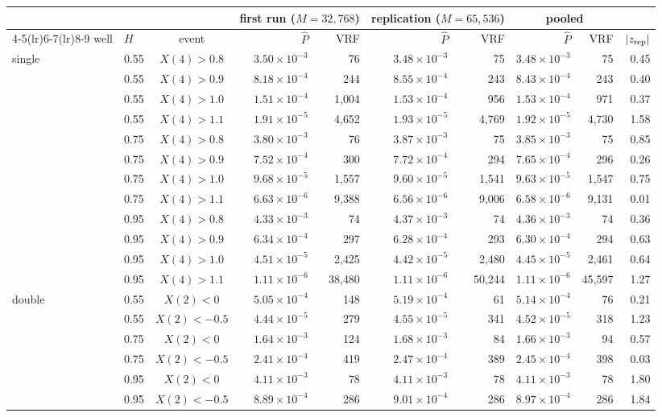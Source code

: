 \begin{tabular}{llcrrrrrrr}\toprule
 & & & \multicolumn{2}{c}{first run ($M=32{,}768$)} & \multicolumn{2}{c}{replication ($M=65{,}536$)} & \multicolumn{2}{c}{pooled} & \\\cmidrule(lr){4-5}\cmidrule(lr){6-7}\cmidrule(lr){8-9}
well & $H$ & event & $\widehat P$ & VRF & $\widehat P$ & VRF & $\widehat P$ & VRF & $|z_{\rm rep}|$\\\midrule
single & 0.55 & $X(4)>0.8$ & $3.50\times10^{-3}$ & 76 & $3.48\times10^{-3}$ & 75 & $3.48\times10^{-3}$ & 75 & 0.45\\
 & 0.55 & $X(4)>0.9$ & $8.18\times10^{-4}$ & 244 & $8.55\times10^{-4}$ & 243 & $8.43\times10^{-4}$ & 243 & 0.40\\
 & 0.55 & $X(4)>1.0$ & $1.51\times10^{-4}$ & 1{,}004 & $1.53\times10^{-4}$ & 956 & $1.53\times10^{-4}$ & 971 & 0.37\\
 & 0.55 & $X(4)>1.1$ & $1.91\times10^{-5}$ & 4{,}652 & $1.93\times10^{-5}$ & 4{,}769 & $1.92\times10^{-5}$ & 4{,}730 & 1.58\\
 & 0.75 & $X(4)>0.8$ & $3.80\times10^{-3}$ & 76 & $3.87\times10^{-3}$ & 75 & $3.85\times10^{-3}$ & 75 & 0.85\\
 & 0.75 & $X(4)>0.9$ & $7.52\times10^{-4}$ & 300 & $7.72\times10^{-4}$ & 294 & $7.65\times10^{-4}$ & 296 & 0.26\\
 & 0.75 & $X(4)>1.0$ & $9.68\times10^{-5}$ & 1{,}557 & $9.60\times10^{-5}$ & 1{,}541 & $9.63\times10^{-5}$ & 1{,}547 & 0.75\\
 & 0.75 & $X(4)>1.1$ & $6.63\times10^{-6}$ & 9{,}388 & $6.56\times10^{-6}$ & 9{,}006 & $6.58\times10^{-6}$ & 9{,}131 & 0.01\\
 & 0.95 & $X(4)>0.8$ & $4.33\times10^{-3}$ & 74 & $4.37\times10^{-3}$ & 74 & $4.36\times10^{-3}$ & 74 & 0.36\\
 & 0.95 & $X(4)>0.9$ & $6.34\times10^{-4}$ & 297 & $6.28\times10^{-4}$ & 293 & $6.30\times10^{-4}$ & 294 & 0.63\\
 & 0.95 & $X(4)>1.0$ & $4.51\times10^{-5}$ & 2{,}425 & $4.42\times10^{-5}$ & 2{,}480 & $4.45\times10^{-5}$ & 2{,}461 & 0.64\\
 & 0.95 & $X(4)>1.1$ & $1.11\times10^{-6}$ & 38{,}480 & $1.11\times10^{-6}$ & 50{,}244 & $1.11\times10^{-6}$ & 45{,}597 & 1.27\\
\midrule
double & 0.55 & $X(2)<0$ & $5.05\times10^{-4}$ & 148 & $5.19\times10^{-4}$ & 61 & $5.14\times10^{-4}$ & 76 & 0.21\\
 & 0.55 & $X(2)<-0.5$ & $4.44\times10^{-5}$ & 279 & $4.55\times10^{-5}$ & 341 & $4.52\times10^{-5}$ & 318 & 1.23\\
 & 0.75 & $X(2)<0$ & $1.64\times10^{-3}$ & 124 & $1.68\times10^{-3}$ & 84 & $1.66\times10^{-3}$ & 94 & 0.57\\
 & 0.75 & $X(2)<-0.5$ & $2.41\times10^{-4}$ & 419 & $2.47\times10^{-4}$ & 389 & $2.45\times10^{-4}$ & 398 & 0.03\\
 & 0.95 & $X(2)<0$ & $4.11\times10^{-3}$ & 78 & $4.11\times10^{-3}$ & 78 & $4.11\times10^{-3}$ & 78 & 1.80\\
 & 0.95 & $X(2)<-0.5$ & $8.89\times10^{-4}$ & 286 & $9.01\times10^{-4}$ & 286 & $8.97\times10^{-4}$ & 286 & 1.84\\
\bottomrule\end{tabular}

